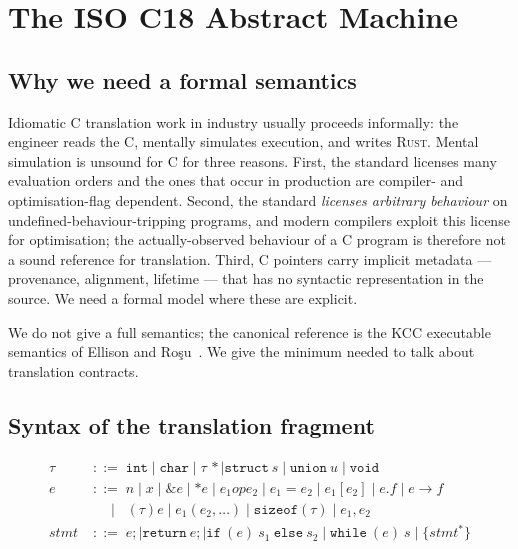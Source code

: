 \documentclass[12pt]{article}
\newcommand{\Expr}{e}
\newcommand{\Type}{\tau}
\newcommand{\rust}{\textnormal{\textsc{Rust}}}
\newcommand{\clang}{\textnormal{\textsc{C}}}
\theoremstyle{definition}
\theoremstyle{remark}
\begin{document}
\section{The ISO C18 Abstract Machine}
\label{sec:absmachine}

\subsection{Why we need a formal semantics}
Idiomatic \clang{} translation work in industry usually proceeds informally: the engineer reads the \clang{}, mentally simulates execution, and writes \rust{}. Mental simulation is unsound for \clang{} for three reasons. First, the standard licenses many evaluation orders and the ones that occur in production are compiler- and optimisation-flag dependent. Second, the standard \emph{licenses arbitrary behaviour} on undefined-behaviour-tripping programs, and modern compilers exploit this license for optimisation; the actually-observed behaviour of a \clang{} program is therefore not a sound reference for translation. Third, \clang{} pointers carry implicit metadata --- provenance, alignment, lifetime --- that has no syntactic representation in the source. We need a formal model where these are explicit.

We do not give a full semantics; the canonical reference is the KCC executable semantics of Ellison and Ro\c{s}u~\cite{ellison2012}. We give the minimum needed to talk about translation contracts.

\subsection{Syntax of the translation fragment}
\begin{align*}
\Type \;&::=\; \mathtt{int} \mid \mathtt{char} \mid \Type\,* \mid \mathtt{struct}\ s \mid \mathtt{union}\ u \mid \mathtt{void} \\
\Expr \;&::=\; n \mid x \mid \&\Expr \mid {*}\Expr \mid \Expr_1 \mathbin{\mathit{op}} \Expr_2 \mid \Expr_1 = \Expr_2 \mid \Expr_1[\Expr_2] \mid \Expr.f \mid \Expr\to f \\
&\quad\mid\;\; (\Type)\Expr \mid \Expr_1(\Expr_2,\ldots) \mid \mathtt{sizeof}(\Type) \mid \Expr_1, \Expr_2 \\
\mathit{stmt} \;&::=\; \Expr; \mid \mathtt{return}\ \Expr; \mid \mathtt{if}\ (\Expr)\ s_1\ \mathtt{else}\ s_2 \mid \mathtt{while}\ (\Expr)\ s \mid \{ \mathit{stmt}^* \}
\end{align*}
\end{document}
